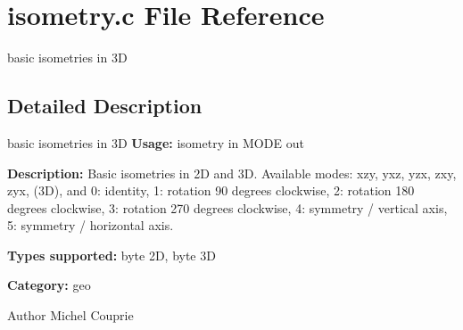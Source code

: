 \section{isometry.c File Reference}
\label{isometry_8c}


basic isometries in 3D  




\subsection{Detailed Description}
basic isometries in 3D {\bfseries Usage:} isometry in MODE out

{\bfseries Description:} Basic isometries in 2D and 3D. Available modes: xzy, yxz, yzx, zxy, zyx, (3D), and 0: identity, 1: rotation 90 degrees clockwise, 2: rotation 180 degrees clockwise, 3: rotation 270 degrees clockwise, 4: symmetry / vertical axis, 5: symmetry / horizontal axis.

{\bfseries Types supported:} byte 2D, byte 3D

{\bfseries Category:} geo

\begin{DoxyAuthor}{Author}
Michel Couprie 
\end{DoxyAuthor}
